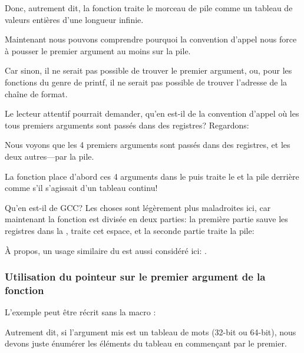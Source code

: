 Donc, autrement dit, la fonction traite le morceau de pile comme un tableau de valeurs
entières d'une longueur infinie.

Maintenant nous pouvons comprendre pourquoi la convention d'appel  nous
force à pousser le premier argument au moins sur la pile.

Car sinon, il ne serait pas possible de trouver le premier argument, ou, pour les
fonctions du genre de printf, il ne serait pas possible de trouver l'adresse de la
chaîne de format.

\label{variadic_arith_registers}

Le lecteur attentif pourrait demander, qu'en est-il de la convention d'appel où les
tous premiers arguments sont passés dans des registres?
Regardons:



Nous voyons que les 4 premiers arguments sont passés dans des registres, et les deux
autres---par la pile.

La fonction  place d'abord ces 4 arguments dans le 
puis traite le  et la pile derrière comme s'il s'agissait d'un tableau
continu!

Qu'en est-il de GCC? Les choses sont légèrement plus maladroites ici, car maintenant
la fonction est divisée en deux parties:
la première partie sauve les registres dans la , traite cet espace,
et la seconde partie traite la pile:



À propos, un usage similaire du  est aussi considéré ici: .

\subsubsection{Utilisation du pointeur sur le premier argument de la fonction}

L'exemple peut être récrit sans la macro :



Autrement dit, si l'argument mis est un tableau de mots (32-bit ou 64-bit), nous devons
juste énumérer les éléments du tableau en commençant par le premier.
